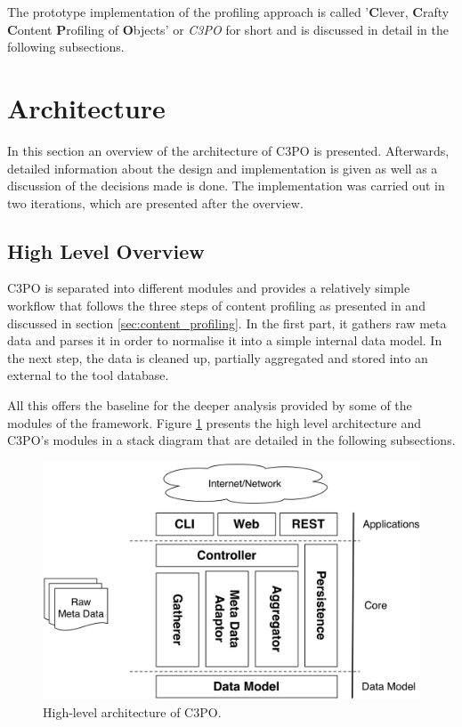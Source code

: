 The prototype implementation of the profiling approach is called '\textbf{C}lever, \textbf{C}rafty \textbf{C}ontent \textbf{P}rofiling of \textbf{O}bjects' or \textit{C3PO} for short and is discussed in detail in the following subsections.

\section{Architecture}
In this section an overview of the architecture of C3PO is presented. Afterwards, detailed information about the design and implementation is given as well as a discussion of the decisions made is done. The implementation was carried out in two iterations, which are presented after the overview.

\subsection{High Level Overview}
C3PO is separated into different modules and provides a relatively simple workflow that follows the three steps of content profiling as presented in \cite{petrov-ipres2012} and discussed in section \ref{sec:content_profiling}. In the first part, it gathers raw meta data and parses it in order to normalise it into a simple internal data model. In the next step, the data is cleaned up, partially aggregated and stored into an external to the tool database. 

All this offers the baseline for the deeper analysis provided by some of the modules of the framework. Figure \ref{fig:architecture_highlevel} presents the high level architecture and C3PO's modules in a stack diagram that are detailed in the following subsections.


\begin{figure}[t]
\begin{center}
\includegraphics[width=5in]{figures/architecture/c3po_highlevel_architecture.png}
\caption{High-level architecture of C3PO.}
\label{fig:architecture_highlevel}
\end{center}
\end{figure}


